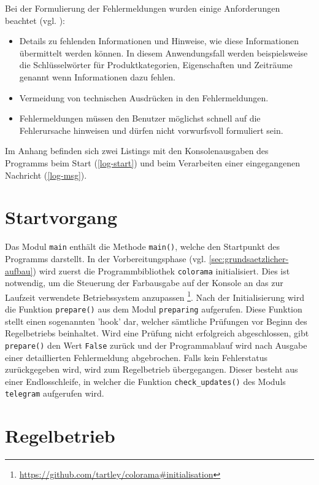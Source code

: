 Bei der Formulierung der Fehlermeldungen wurden einige Anforderungen beachtet (vgl. \cite[S. 495]{ux}): 

\begin{itemize}
\item Details zu fehlenden Informationen und Hinweise, wie diese Informationen übermittelt werden können. In diesem Anwendungsfall werden beispielsweise die Schlüsselwörter für Produktkategorien, Eigenschaften und Zeiträume genannt wenn Informationen dazu fehlen.
\item Vermeidung von technischen Ausdrücken in den Fehlermeldungen.
\item Fehlermeldungen müssen den Benutzer möglichst schnell auf die Fehlerursache hinweisen und dürfen nicht vorwurfsvoll formuliert sein.
\end{itemize}

Im Anhang befinden sich zwei Listings mit den Konsolenausgaben des Programms beim Start (\autoref{log-start}) und beim Verarbeiten einer eingegangenen Nachricht (\autoref{log-msg}).

\section{Startvorgang}
\label{sec:startvorgang}

Das Modul \lstinline{main} enthält die Methode \lstinline{main()}, welche den Startpunkt des Programms darstellt. In der Vorbereitungsphase (vgl. \autoref{sec:grundsaetzlicher-aufbau}) wird zuerst die Programmbibliothek \lstinline{colorama} initialisiert. Dies ist notwendig, um die Steuerung der Farbausgabe auf der Konsole an das zur Laufzeit verwendete Betriebssystem anzupassen \footnote{\url{https://github.com/tartley/colorama\#initialisation}}. Nach der Initialisierung wird die Funktion \lstinline{prepare()} aus dem Modul \lstinline{preparing} aufgerufen. Diese Funktion stellt einen sogenannten 'hook' dar, welcher sämtliche Prüfungen vor Beginn des Regelbetriebs beinhaltet. Wird eine Prüfung nicht erfolgreich abgeschlossen, gibt \lstinline{prepare()} den Wert \lstinline{False} zurück und der Programmablauf wird nach Ausgabe einer detaillierten Fehlermeldung abgebrochen. Falls kein Fehlerstatus zurückgegeben wird, wird zum Regelbetrieb übergegangen. Dieser besteht aus einer Endlosschleife, in welcher die Funktion \lstinline{check_updates()} des Moduls \lstinline{telegram} aufgerufen wird.

\section{Regelbetrieb}

